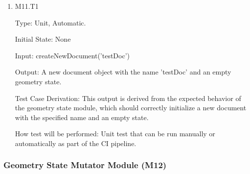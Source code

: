 \documentclass[12pt, titlepage]{article}
\begin{document}
\begin{enumerate}

\item{M11.T1\\}

Type: Unit, Automatic.

Initial State: None

Input: createNewDocument('testDoc')

Output: A new document object with the name 'testDoc' and an empty geometry state.

Test Case Derivation:
This output is derived from the expected behavior of the geometry state module, which
    should correctly initialize a new document with the specified name and an empty state.

How test will be performed:
Unit test that can be run manually or automatically as part of the CI pipeline.

\end{enumerate}

\subsubsection{Geometry State Mutator Module (M12)}
\end{document}
